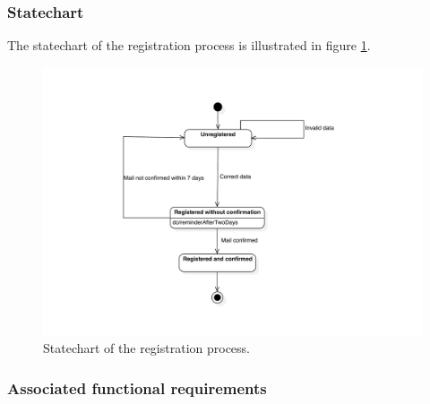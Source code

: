 \subsubsection{Statechart}
The statechart of the registration process is illustrated in figure \ref{fig:statechart-registration}.
\begin{figure}
\includegraphics[width=\textwidth]{diagrams/statechart_registration.pdf}
\caption{Statechart of the registration process.}
\label{fig:statechart-registration}
\end{figure}

\subsubsection{Associated functional requirements}


